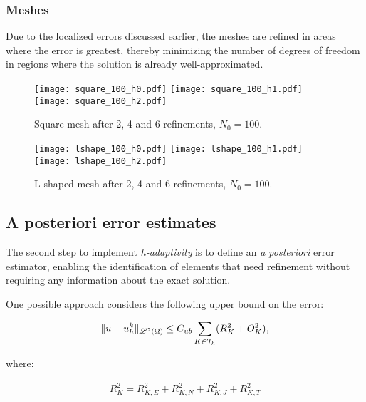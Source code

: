 \newpage
\subsubsection{Meshes}

Due to the localized errors discussed earlier, the meshes are refined in areas where the error is greatest, thereby minimizing the number of degrees of freedom in regions where the solution is already well-approximated.

\begin{figure}[!ht]
	\centering
	\texttt{[image: square\_100\_h0.pdf]}
    \texttt{[image: square\_100\_h1.pdf]}
    \texttt{[image: square\_100\_h2.pdf]}
	\caption{Square mesh after 2, 4 and 6 refinements, $N_0 = 100$.}
\end{figure}

\begin{figure}[!ht]
	\centering
	\texttt{[image: lshape\_100\_h0.pdf]}
    \texttt{[image: lshape\_100\_h1.pdf]}
    \texttt{[image: lshape\_100\_h2.pdf]}
	\caption{L-shaped mesh after 2, 4 and 6 refinements, $N_0 = 100$.}
\end{figure}

\newpage
\subsection{A posteriori error estimates}

The second step to implement \textit{h-adaptivity} is to define an \textit{a posteriori} error estimator, enabling the identification of elements that need refinement without requiring any information about the exact solution.

\cite{Cangiani2023} One possible approach considers the following upper bound on the error:

\begin{gather}
	\lVert u - u^k_h \rVert_{\mathscr{L}^2(\Omega)} \leq C_{ub} \sum_{K \in \mathcal{T}_h} (R_K^2 + O_K^2),
\end{gather}

where:

\begin{gather}
	R_K^2 = R_{K, E}^2 + R_{K, N}^2 + R_{K, J}^2 + R_{K, T}^2
\end{gather}

